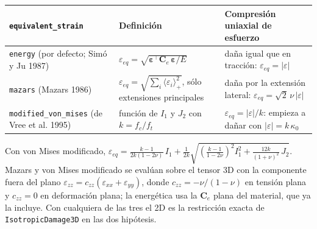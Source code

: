 \documentclass[11pt,oneside]{report}
\begin{document}
\begin{center}
\begin{tabularx}{\textwidth}{YYY}
\hline
\textbf{\texttt{equivalent\_\allowbreak{}strain}} & \textbf{Definición} & \textbf{Compresión uniaxial de esfuerzo} \\
\hline
\texttt{energy} (por defecto; Simó y Ju 1987) & $\varepsilon_{eq} = \sqrt{\boldsymbol\varepsilon^\top\mathbf C_e\,\boldsymbol\varepsilon/E}$ & daña igual que en tracción: $\varepsilon_{eq} = \lvert\varepsilon\rvert$ \\
\texttt{mazars} (Mazars 1986) & $\varepsilon_{eq} = \sqrt{\sum_i\langle\varepsilon_i\rangle_+^2}$, sólo extensiones principales & daña por la extensión lateral: $\varepsilon_{eq} = \sqrt2\,\nu\,\lvert\varepsilon\rvert$ \\
\texttt{modified\_\allowbreak{}von\_\allowbreak{}mises} (de Vree et al. 1995) & función de $I_1$ y $J_2$ con $k = f_c/f_t$ & $\varepsilon_{eq} = \lvert\varepsilon\rvert/k$: empieza a dañar con $\lvert\varepsilon\rvert = k\,\kappa_0$ \\
\hline
\end{tabularx}
\end{center}
Con von Mises modificado, $\varepsilon_{eq} = \frac{k-1}{2k(1-2\nu)}\,I_1 + \frac{1}{2k}\sqrt{\left(\frac{k-1}{1-2\nu}\right)^2 I_1^2 + \frac{12k}{(1+\nu)^2}\,J_2}$. Mazars y von Mises modificado se evalúan sobre el tensor 3D con la componente fuera del plano $\varepsilon_{zz} = c_{zz}(\varepsilon_{xx} + \varepsilon_{yy})$, donde $c_{zz} = -\nu/(1-\nu)$ en tensión plana y $c_{zz} = 0$ en deformación plana; la energética usa la $\mathbf C_e$ plana del material, que ya la incluye. Con cualquiera de las tres el 2D es la restricción exacta de \texttt{IsotropicDamage3D} en las dos hipótesis.
\end{document}
